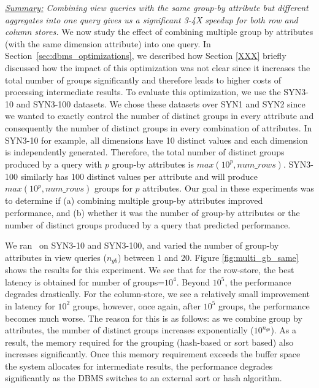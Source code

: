 {\em \underline{Summary:} Combining view queries with the same group-by attribute
but different aggregates into one query gives us a significant 
3-4X speedup for both row and column stores.}
We now study the effect of combining multiple group by attributes (with the
same dimension attribute) into one query.
In Section~\ref{sec:dbms_optimizations}, we described
how 
Section \ref{XXX} briefly discussed how the impact of this optimization was not
clear since it increases the total number of groups significantly and therefore
leads to higher costs of processing intermediate results.
To evaluate this optimization, we use the SYN3-10 and SYN3-100 datasets.
We chose these datasets over SYN1 and SYN2 since we wanted to exactly control
the number of distinct groups in every attribute and consequently the number of
distinct groups in every combination of attributes.
In SYN3-10 for example, all dimensions have 10 distinct values and each
dimension is independently generated. 
Therefore, the total number of distinct
groups produced by a query with $p$ group-by attributes is $max(10^p,
num\_rows)$.
SYN3-100 similarly has 100 distinct values per attribute and will produce
$max(10^p, num\_rows)$ groups for $p$ attributes.
Our goal in these experiments was to determine if (a) combining multiple
group-by attributes improved performance, and (b) whether it was the number of
group-by attributes or the number of distinct groups produced by a query that
predicted performance.

We ran \VizRecDB\ on SYN3-10 and SYN3-100, and varied the number of
group-by attributes in view queries ($n_{gb}$) between 1 and 20.
Figure \ref{fig:multi_gb_same} shows the results for this experiment.
We see that for the row-store, the best latency is obtained for number of
groups=$10^4$.
Beyond $10^5$, the performance degrades drastically.    For the column-store, we see a
relatively small improvement in latency for $10^2$ groups, however, once again,
after $10^5$ groups, the performance becomes much worse.
The reason for this is as follows: as we combine group by attributes, the number
of distinct groups increases exponentially ($10^{n_{gb}}$).
As a result, the memory required for the grouping (hash-based or sort based)
also increases significantly.
Once this memory requirement exceeds the buffer space the system allocates for
intermediate results, the performance degrades significantly as the DBMS
switches to an external sort or hash algorithm.


